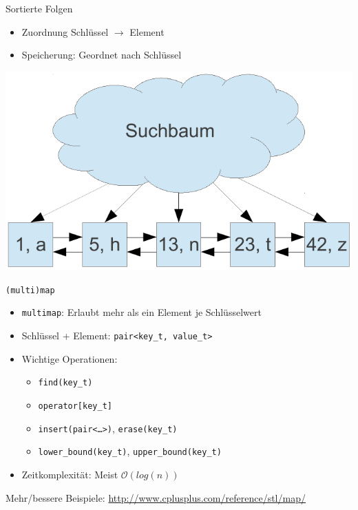 \begin{frame}{Sortierte Folgen}
	\begin{itemize}
		\item Zuordnung Schlüssel $\rightarrow$ Element
		\item Speicherung: Geordnet nach Schlüssel
	\end{itemize}
	\begin{center}
		\includegraphics[width=0.7\linewidth]{images/sorted_sequence.pdf}
	\end{center}
\end{frame}

\begin{frame}{\texttt{(multi)map}}
	\begin{itemize}
		\item \texttt{multimap}: Erlaubt mehr als ein Element je Schlüsselwert
		\item Schlüssel + Element: \texttt{pair<key\_t, value\_t>}
		\pause
		\item Wichtige Operationen:
		\begin{itemize}
			\item \texttt{find(key\_t)}
			\item \texttt{operator[key\_t]}
			\item \texttt{insert(pair<\dots>)}, \texttt{erase(key\_t)}
			\item \texttt{lower\_bound(key\_t)}, \texttt{upper\_bound(key\_t)}
		\end{itemize}
		\pause
		\item Zeitkomplexität: Meist $\mathcal{O}(log(n))$
	\end{itemize}
	
	\pause
	
	\pause
	
	\footnotesize
	Mehr/bessere Beispiele: \url{http://www.cplusplus.com/reference/stl/map/}
\end{frame}

